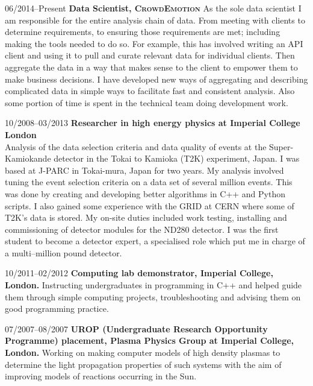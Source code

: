 \documentclass[a4paper]{article}
\begin{document}
\begin{CV}

\item[06/2014--Present] \textbf{Data Scientist, \textsc{CrowdEmotion}} As the sole data scientist I am responsible for the entire analysis chain of data. From meeting with clients to determine requirements, to ensuring those requirements are met; including making the tools needed to do so. For example, this has involved writing an API client and using it to pull and curate relevant data for individual clients. Then aggregate the data in a way that makes sense to the client to empower them to make business decisions. I have developed new ways of aggregating and describing complicated data in simple ways to facilitate fast and consistent analysis. Also some portion of time is spent in the technical team doing development work.

\item[10/2008--03/2013] \textbf{Researcher in high energy physics at Imperial College London}\\
Analysis of the data selection criteria and data quality of events at the Super-Kamiokande detector in the Tokai to Kamioka (T2K) experiment, Japan. I was based at J-PARC in Tokai-mura, Japan for two years. My analysis involved tuning the event selection criteria on a data set of several million events. This was done by creating and developing better algorithms in C++ and Python scripts. I also gained some experience with the GRID at CERN where some of T2K's data is stored. My on-site duties included work testing, installing and commissioning of detector modules for the ND280 detector. I was the first student to become a detector expert, a specialised role which put me in charge of a multi--million pound detector.

\item[10/2011--02/2012] \textbf{Computing lab demonstrator, Imperial College, London.} Instructing undergraduates in programming in C++ and helped guide them through simple computing projects, troubleshooting and advising them on good programming practice.

\item[07/2007--08/2007] \textbf{UROP (Undergraduate Research Opportunity Programme)
placement,
Plasma Physics Group at Imperial College, London.} Working on making computer
models of high density plasmas to determine the light propagation properties
of such systems with the aim of improving models of reactions occurring in the
Sun.
% 
% 


\end{CV}
\end{document}
